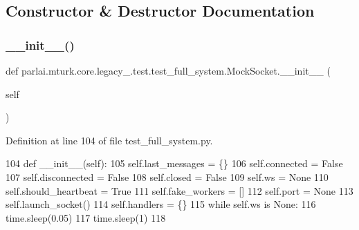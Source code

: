 \subsection{Constructor \& Destructor Documentation}
\mbox{\label{classparlai_1_1mturk_1_1core_1_1legacy__2018_1_1test_1_1test__full__system_1_1MockSocket_a4d744098fe9a3e3efee2a09fbaae41e0}} 
\subsubsection{\texorpdfstring{\+\_\+\+\_\+init\+\_\+\+\_\+()}{\_\_init\_\_()}}
{\footnotesize\ttfamily def parlai.\+mturk.\+core.\+legacy\+\_.\+test.\+test\+\_\+full\+\_\+system.\+Mock\+Socket.\+\_\+\+\_\+init\+\_\+\+\_\+ (\begin{DoxyParamCaption}\item[{}]{self }\end{DoxyParamCaption})}



Definition at line 104 of file test\+\_\+full\+\_\+system.\+py.


\begin{DoxyCode}
104     \textcolor{keyword}{def }\_\_init\_\_(self):
105         self.last\_messages = \{\}
106         self.connected = \textcolor{keyword}{False}
107         self.disconnected = \textcolor{keyword}{False}
108         self.closed = \textcolor{keyword}{False}
109         self.ws = \textcolor{keywordtype}{None}
110         self.should\_heartbeat = \textcolor{keyword}{True}
111         self.fake\_workers = []
112         self.port = \textcolor{keywordtype}{None}
113         self.launch\_socket()
114         self.handlers = \{\}
115         \textcolor{keywordflow}{while} self.ws \textcolor{keywordflow}{is} \textcolor{keywordtype}{None}:
116             time.sleep(0.05)
117         time.sleep(1)
118 
\end{DoxyCode}


